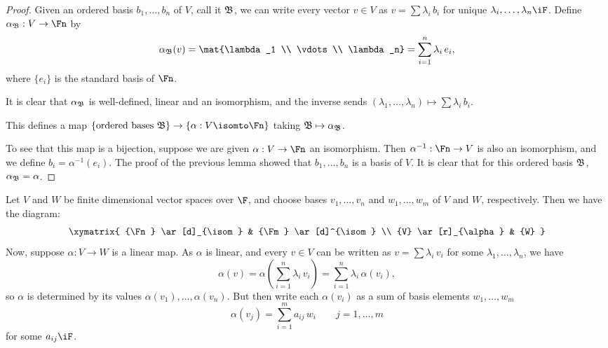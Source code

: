 \begin{proof}
	Given an ordered basis $b_1,\ldots,b_n$ of $V$, call it $\frak B$, we can write every vector $v\in V$ as $v=\sum \lambda_i \,b_i$ for unique $\lambda_i,\ldots,\lambda_n\iF$. Define $\alpha_\frak{B}:V\to\Fn$ by %
	\begin{equation*}
		\alpha_\frak{B}(v)
		= \mat{\lambda_1 \\ \vdots \\ \lambda_n}
		= \sum_{i=1}^n \lambda_i \, e_i,
	\end{equation*}
	where $\{e_i\}$ is the standard basis of $\Fn$.

	It is clear that $\alpha_\frak{B}$ is well-defined, linear and an isomorphism, and the inverse sends $\left( \lambda_1,\ldots,\lambda_n \right) \mapsto \sum \lambda_i \,b_i$. %

	This defines a map $\left\{\text{ordered bases } \frak{B}\right\} \to \left\{\alpha:V\isomto \Fn\right\}$ taking $\frak{B} \mapsto \alpha_\frak{B}$. %

	To see that this map is a bijection, suppose we are given $\alpha:V\to\Fn$ an isomorphism. Then $\alpha^{-1}:\Fn\to V$ is also an isomorphism, and we define $b_i = \alpha^{-1}(e_i)$. The proof of the previous lemma showed that $b_1, \dots, b_n$ is a basis of $V$. It is clear that for this ordered basis $\frak B$, $\alpha_{\frak{B}} = \alpha$. %
\end{proof}

Let $V$ and $W$ be finite dimensional vector spaces over $\F$, and choose bases $v_1,\ldots,v_n$ and $w_1,\ldots,w_m$ of $V$ and $W$, respectively. Then we have the diagram:
\begin{equation*}
	\xymatrix{
		{\Fn} \ar[d]_{\isom} & {\Fm} \ar[d]^{\isom} \\
		{V} \ar[r]_{\alpha} & {W}
	}
\end{equation*}
Now, suppose $\alpha:V\to W$ is a linear map. As $\alpha$ is linear, and every $v\in V$ can be written as $v=\sum \lambda_i \, v_i$ for some $\lambda_1,\ldots,\lambda_n$, we have
\begin{equation*}
	\alpha(v)=\alpha\left( \sum_{i=1}^n \lambda_i \,v_i \right) = \sum_{i=1}^n \lambda_i \, \alpha(v_i), %
\end{equation*}
so $\alpha$ is determined by its values $\alpha(v_1),\ldots,\alpha(v_n)$. But then write each $\alpha(v_i)$ as a sum of basis elements $w_1,\ldots,w_m$
\begin{equation*}
	\alpha(v_j) = \sum_{i=1}^m a_{ij} \,w_i \qquad j=1,\ldots,m
\end{equation*}
for some $a_{ij}\iF$.

